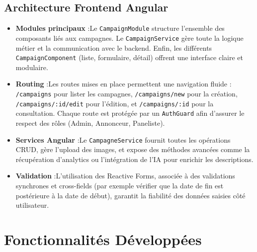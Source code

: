 \subsection{Architecture Frontend Angular}
\begin{itemize}[label=\textbullet]
    \item \textbf{Modules principaux} :\newline Le \texttt{CampaignModule} structure l’ensemble des composants liés aux campagnes. \newline
    Le \texttt{CampaignService} gère toute la logique métier et la communication avec le backend.
    Enfin, les différents \texttt{CampaignComponent} (liste, formulaire, détail) offrent une interface claire et modulaire.
    \item \textbf{Routing} :\newline Les routes mises en place permettent une navigation fluide :
    \texttt{/campaigns} pour lister les campagnes, \texttt{/campaigns/new} pour la création,
    \texttt{/campaigns/:id/edit} pour l’édition, et \texttt{/campaigns/:id} pour la consultation.
    Chaque route est protégée par un \texttt{AuthGuard} afin d’assurer le respect des rôles (Admin, Annonceur, Paneliste).
    \item \textbf{Services Angular} :\newline Le \texttt{CampagneService} fournit toutes les opérations CRUD, gère l’upload des images,
    et expose des méthodes avancées comme la récupération d’analytics ou l’intégration de l’IA pour enrichir les descriptions.
    \item \textbf{Validation} :\newline L’utilisation des Reactive Forms, associée à des validations synchrones et cross-fields
    (par exemple vérifier que la date de fin est postérieure à la date de début), garantit la fiabilité des données saisies côté utilisateur.
\end{itemize}
\section{Fonctionnalités Développées}

